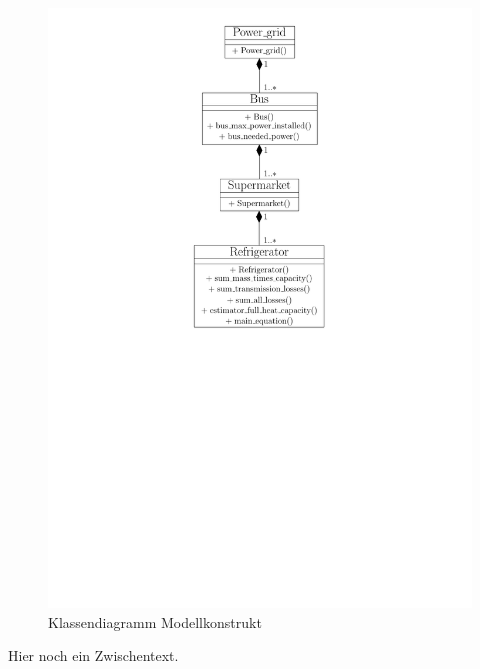 \begin{figure}[h]
\caption{Klassendiagramm Modellkonstrukt}
	\label{klassendiagramm}
	\begin{center}
	\includegraphics[scale=0.8]{images/Theorie_Super/class_diagramm}
	\end{center}
\end{figure}

Hier noch ein Zwischentext.

